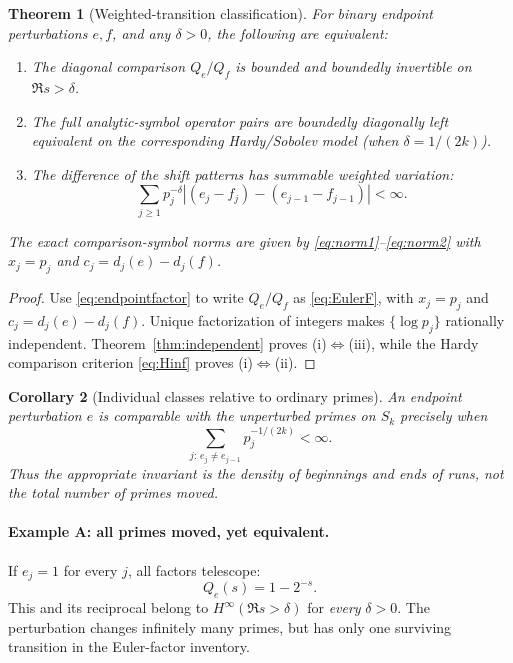 \documentclass[12pt,letterpaper]{article}
\newtheorem{theorem}{Theorem}[section]
\newtheorem{corollary}[theorem]{Corollary}
\numberwithin{equation}{section}
\theoremstyle{remark}
\begin{document}
\begin{theorem}[Weighted-transition classification]\label{thm:transition}
For binary endpoint perturbations $e,f$, and any $\delta>0$, the following are equivalent:
\begin{enumerate}[label=(\roman*),leftmargin=2em]
\item The diagonal comparison $Q_e/Q_f$ is bounded and boundedly invertible on $\Re s>\delta$.
\item The full analytic-symbol operator pairs are boundedly diagonally left equivalent on the corresponding Hardy/Sobolev model (when $\delta=1/(2k)$).
\item The difference of the shift patterns has summable \emph{weighted variation}:
\begin{equation}\label{eq:BV}
 \boxed{\sum_{j\ge1}p_j^{-\delta}
 \left|(e_j-f_j)-(e_{j-1}-f_{j-1})\right|<\infty.}
\end{equation}
\end{enumerate}
The exact comparison-symbol norms are given by \eqref{eq:norm1}--\eqref{eq:norm2} with $x_j=p_j$ and $c_j=d_j(e)-d_j(f)$.
\end{theorem}
\begin{proof}
Use \eqref{eq:endpointfactor} to write $Q_e/Q_f$ as \eqref{eq:EulerF}, with $x_j=p_j$ and $c_j=d_j(e)-d_j(f)$. Unique factorization of integers makes $\{\log p_j\}$ rationally independent. Theorem~\ref{thm:independent} proves (i)$\Longleftrightarrow$(iii), while the Hardy comparison criterion \eqref{eq:Hinf} proves (i)$\Longleftrightarrow$(ii).
\end{proof}

\begin{corollary}[Individual classes relative to ordinary primes]\label{cor:blocks}
An endpoint perturbation $e$ is comparable with the unperturbed primes on $S_k$ precisely when
\[
 \sum_{j:\,e_j\ne e_{j-1}}p_j^{-1/(2k)}<\infty.
\]
Thus the appropriate invariant is the \emph{density of beginnings and ends of runs}, not the total number of primes moved.
\end{corollary}

\paragraph{Example A: all primes moved, yet equivalent.}
If $e_j=1$ for every $j$, all factors telescope:
\[
 Q_e(s)=1-2^{-s}.
\]
This and its reciprocal belong to $H^\infty(\Re s>\delta)$ for \emph{every} $\delta>0$. The perturbation changes infinitely many primes, but has only one surviving transition in the Euler-factor inventory.
\end{document}
